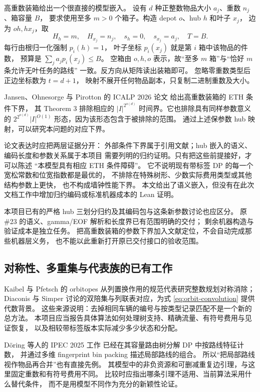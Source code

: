 \documentclass[UTF8,a4paper,11pt,fontset=fandol]{ctexart}
\theoremstyle{definition}
\begin{document}
高重数装箱给出一个很直接的模型嵌入。
设有 $d$ 种正整数物品大小 $a_j$、重数 $n_j$、箱容量 $B$，
要求使用至多 $m>0$ 个箱子。构造 depot $o$、hub $h$ 和叶子 $x_j$，
边为 $oh,hx_j$，取
\[
H_h=m,\quad H_{x_j}=n_j,\quad
s_h=0,\quad s_{x_j}=a_j,\quad T=B.
\]
每行由根归一化强制 $p_i(h)=1$，
叶子坐标 $p_i(x_j)$ 就是第 $i$ 箱中该物品的件数，
预算是 $\sum_ja_jp_i(x_j)\le B$。
空箱由 $o,h,o$ 表示，故“至多 $m$ 箱”与“恰好 $m$ 条允许无叶任务的路线”
一致。反方向从矩阵读出装箱即可。
忽略零重数类型后正边坐标数为 $t=d+1$，
映射不展开任何物品副本，只复制二进制重数及大小。

Jansen、Ohnesorge 与 Pirotton 的 ICALP 2026 论文
\cite{jansen2026lower} 给出高重数装箱的 ETH 条件下界，
其 Theorem 3 排除相应的
$|I|^{2^{o(d)}}$ 时间界。它也排除具有同样参数意义的
$2^{2^{o(d)}}|I|^{O(1)}$ 形态，因为该形态包含于被排除的范围。
通过上述保参数 hub 映射，可以研究本问题的对应下界。

论文表达时应把两层证据分开：
外部条件下界属于引用文献；hub 嵌入的语义、编码长度和参数关系属于本项目
需要列明的归约证明。只有把这些前提接好，才可以陈述
“本模型具有相应 ETH 条件障碍”。
它不说明现有带标签 DP 的每一个宽松常数和位宽指数都是最优的，
不排除在特殊树形、少数实际费用类型或其他结构参数上更快，
也不构成墙钟性能下界。
本文给出了语义嵌入，但没有在此次文档工作中增加归约编码或标准机器成本的 Lean 证明。

本项目已有的严格 hub 三划分归约及其编码包与这条新参数讨论也应区分。
原 \#23 的语义、gamma/EOF 解析和长度界已有范围明确的交付；
剩余机器构造与验证成本是独立任务。
把高重数装箱的参数下界加入文献定位，不会自动完成那些机器层义务，
也不能以此重新打开原已交付接口的验收范围。

\subsection{对称性、多重集与代表族的已有工作}

Kaibel 与 Pfetsch 的 orbitopes \cite{kaibel2008}
从列置换作用的规范代表研究整数规划对称消除；
Diaconis 与 Simper \cite{diaconis2021}
讨论的双陪集与列联表对应，为式 \eqref{eq:orbit-convolution} 提供代数背景。
这些来源说明：去掉相同车辆的编号与按类型记录匹配不是一个新的总方法。
本项目应当报告具体算法如何处理树支持、精确流量、有符号费用与见证恢复，
以及相较带标签版本实际减少多少状态和分配。

D\"oring 等人的 IPEC 2025 工作 \cite{doering2025}
已经在其容量路由树分解 DP 中按路线特征计数，
并通过多维 fingerprint bin packing 描述局部路线的组合。
所以“把局部路线视作物品再合并”也有直接先例。
其模型中的非负资源和可删减重复边引理，与这里固定重数和有符号费用不同。
比较时应指出哪条引理不适用、当前算法采用什么替代条件，
而不是用模型不同作为充分的新颖性论证。
\end{document}
